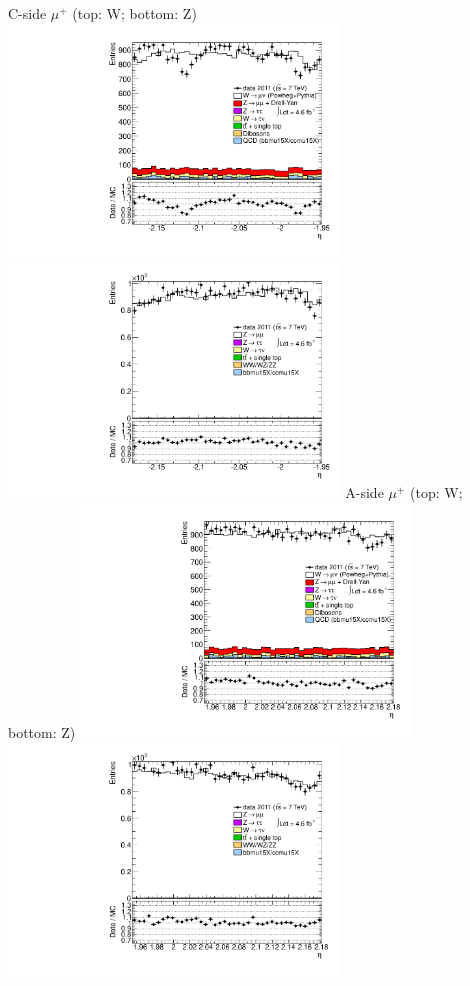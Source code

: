  {
\colb[T]
C-side $\mu^{+}$ (top: W; bottom: Z)
\centering
\includegraphics[width=0.66\textwidth]{dates/20130306/figures/both/WpItoI_10_C_stack_l_eta_POS} \\
\includegraphics[width=0.66\textwidth]{dates/20130306/figures/both/Z_10_C_stack_lP_eta_ALL.pdf}
A-side $\mu^{+}$ (top: W; bottom: Z)
\centering
\includegraphics[width=0.66\textwidth]{dates/20130306/figures/both/WpItoI_10_A_stack_l_eta_POS} \\
\includegraphics[width=0.66\textwidth]{dates/20130306/figures/both/Z_10_A_stack_lP_eta_ALL.pdf} 
\cole
}


